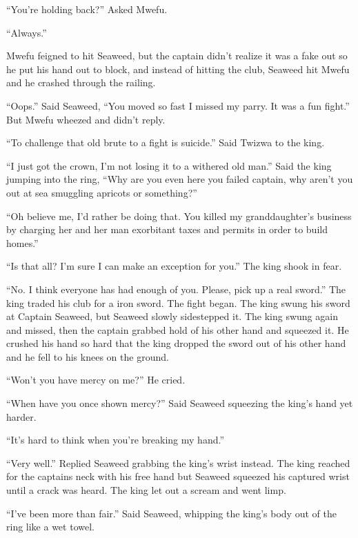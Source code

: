 ``You're holding back?'' Asked Mwefu.

``Always.''

Mwefu feigned to hit Seaweed, but the captain didn't realize it was a fake out so he put his hand out to block, and instead of hitting the club, Seaweed hit Mwefu and he crashed through the railing.

``Oops.'' Said Seaweed, ``You moved so fast I missed my parry. It was a fun fight.'' But Mwefu wheezed and didn't reply.

``To challenge that old brute to a fight is suicide.'' Said Twizwa to the king.

``I just got the crown, I'm not losing it to a withered old man.'' Said the king jumping into the ring, ``Why are you even here you failed captain, why aren't you out at sea smuggling apricots or something?''

``Oh believe me, I'd rather be doing that. You killed my granddaughter's business by charging her and her man exorbitant taxes and permits in order to build homes.''

``Is that all? I'm sure I can make an exception for you.'' The king shook in fear.

``No. I think everyone has had enough of you. Please, pick up a real sword.'' The king traded his club for a iron sword. The fight began. The king swung his sword at Captain Seaweed, but Seaweed slowly sidestepped it. The king swung again and missed, then the captain grabbed hold of his other hand and squeezed it. He crushed his hand so hard that the king dropped the sword out of his other hand and he fell to his knees on the ground.

``Won't you have mercy on me?'' He cried.

``When have you once shown mercy?'' Said Seaweed squeezing the king's hand yet harder.

``It's hard to think when you're breaking my hand.''


``Very well.'' Replied Seaweed grabbing the king's wrist instead. The king reached for the captains neck with his free hand but Seaweed squeezed his captured wrist until a crack was heard. The king let out a scream and went limp.

``I've been more than fair.'' Said Seaweed, whipping the king's body out of the ring like a wet towel.


